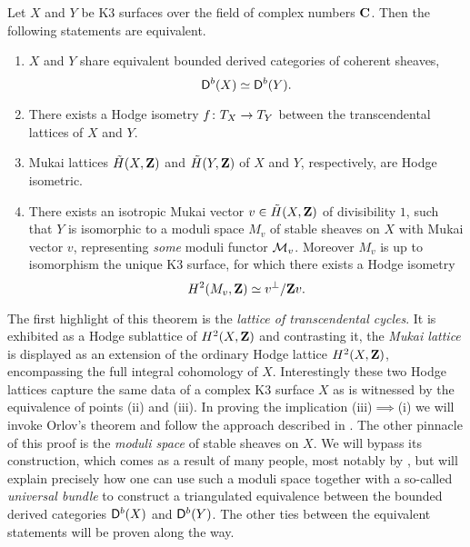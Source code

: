 \begin{theorem*}
    Let $X$ and $Y$ be K3 surfaces over the field of complex numbers $\mathbf C$. Then the following statements are equivalent.
    \begin{enumerate}[label = (\roman*)]
        \item{$X$ and $Y$ share equivalent bounded derived categories of coherent sheaves, 
        \[
            \mathsf{D}^b(X) \simeq \mathsf{D}^b(Y).
        \]
        }
        \item{There exists a Hodge isometry $f \colon T_{X} \to T_{Y}$ between the transcendental lattices of $X$ and $Y$.}
        \item{Mukai lattices $\,\tilde{\!{H}}(X, \mathbf Z)$ and $\,\tilde{\!{H}}(Y, \mathbf Z)$ of $X$ and $Y$, respectively, are Hodge isometric. 
        }
        \item{There exists 
        an isotropic Mukai vector $v \in \,\tilde{\!{H}}(X, \mathbf Z)$ of divisibility $1$,
        such that $Y$ is isomorphic to a moduli space $M_v$ of stable sheaves on $X$ with Mukai vector $v$, representing \emph{some} moduli functor $\mathcal M_v$. Moreover $M_v$ is up to isomorphism the unique K3 surface, for which there exists a Hodge isometry
        \[
            H^{2}(M_v, \mathbf Z) \simeq v^\perp / \mathbf Z v.
        \]
        }
    \end{enumerate}
\end{theorem*}

The first highlight of this theorem is the \emph{lattice of transcendental cycles}. It is exhibited as a Hodge sublattice of $H^{2}(X, \mathbf Z)$ and contrasting it, the \emph{Mukai lattice} is displayed as an extension of the ordinary Hodge lattice $H^{2}(X, \mathbf Z)$, encompassing the full integral cohomology of $X$. Interestingly these two Hodge lattices capture the same data of a complex K3 surface $X$ as is witnessed by the equivalence of points (ii) and (iii). In proving the implication (iii)$\implies$(i) we will invoke Orlov's theorem and follow the approach described in \cite{Orlov2003}. The other pinnacle of this proof is the \emph{moduli space} of stable sheaves on $X$. We will bypass its construction, which comes as a result of many people, most notably by \cite{GottscheHuybrechts1996,OGrady1997,huybrechts2006fouriermukai}, but will explain precisely how one can use such a moduli space together with a so-called \emph{universal bundle} to construct a triangulated equivalence between the bounded derived categories $\mathsf{D}^b(X)$ and $\mathsf{D}^b(Y)$. The other ties between the equivalent statements will be proven along the way. 

